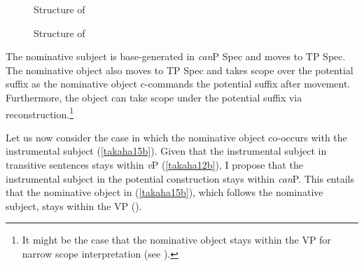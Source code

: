 \documentclass[output=paper]{langscibook}
\begin{document}
\begin{figure}
\begin{floatrow}
\captionsetup{margin=.05\linewidth}
        {\caption{\label{takaha16}Structure of }}%
    {\caption{\label{takaha17}Structure of }}
\end{floatrow}
\end{figure}


The nominative subject is base-generated in \emph{can}P Spec and moves to TP Spec. The nominative object also moves to TP Spec and takes scope over the potential suffix as the nominative object  c-commands the potential suffix after movement. Furthermore, the object can take scope under the potential suffix via reconstruction.\footnote{It might be the case that the nominative object stays within the VP for narrow scope interpretation (see \citealt{nomura2005, ochisaruwatari2014a}).}

Let us now consider the case in which the nominative object co-occurs with the instrumental subject (\ref{takaha15b}). Given that the instrumental subject in transitive sentences stays within \emph{v}P (\ref{takaha12b}), I propose that the instrumental subject in the potential construction stays within \emph{can}P. This entails that the nominative object in (\ref{takaha15b}), which follows the nominative subject, stays within the VP ().
\end{document}
